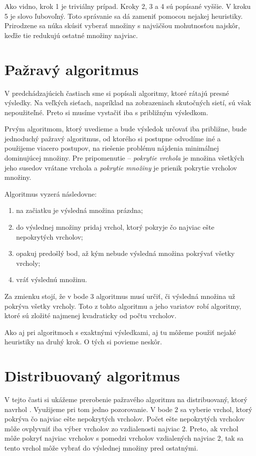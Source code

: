 Ako vidno, krok 1 je triviálny prípad. Kroky 2, 3 a 4 sú popísané vyššie. 
V kroku 5 je slovo ľubovoľný. Toto správanie sa dá zameniť pomocou nejakej 
heuristiky. Prirodzene sa núka skúsiť vyberať množiny s najväčšou mohutnosťou 
najskôr, keďže tie redukujú ostatné množiny najviac.

\section{Pažravý algoritmus}

V predchádzajúcich častiach sme si popísali algoritmy, ktoré rátajú presné 
výsledky. Na veľkých sieťach, napríklad na zobrazeniach skutočných sietí, 
sú však nepoužiteľné. Preto si musíme vystačiť iba s približným výsledkom. 

Prvým algoritmom, ktorý uvedieme a bude výsledok určovať iba približne, bude 
jednoduchý pažravý algoritmus, od ktorého si postupne odvodíme iné a použijeme 
viacero postupov, na riešenie problému nájdenia minimálnej dominujúcej množiny. 
Pre pripomenutie -- \emph{pokrytie vrchola} je množina všetkých jeho susedov 
vrátane vrchola a \emph{pokrytie množiny} je prienik pokrytie vrcholov množiny. 

Algoritmus vyzerá následovne:
\begin{enumerate}
	\item na začiatku je výsledná množina prázdna;
	\item do výslednej množiny pridaj vrchol, ktorý pokryje čo najviac ešte 
		nepokrytých vrcholov;
	\item opakuj predošlý bod, až kým nebude výsledná množina pokrývať všetky 
		vrcholy;
	\item vráť výslednú množinu.
\end{enumerate}

Za zmienku stojí, že v bode 3 algoritmus musí určiť, či výsledná množina už 
pokrýva všetky vrcholy. Toto z tohto algoritmu a jeho variatov robí algoritmy, 
ktoré sú zložité najmenej kvadraticky od počtu vrcholov.

Ako aj pri algoritmoch s exaktnými výsledkami, aj tu môžeme použiť nejaké 
heuristiky na druhý krok. O tých si povieme neskôr.

\section{Distribuovaný algoritmus}

V tejto časti si ukážeme prerobenie pažravého algoritmu na distribuovaný, ktorý 
navrhol \citet{chapS}. 
Využijeme pri tom jedno pozorovanie. V bode 2 sa vyberie vrchol, ktorý pokrýva 
čo najviac ešte nepokrytých vrcholov. Počet ešte nepokrytých vrcholov môže 
ovplyvniť iba výber vrcholov zo vzdialenosti najviac 2. Preto, ak vrchol môže 
pokryť najviac vrcholov s pomedzi vrcholov vzdialených najviac 2, tak sa tento 
vrchol môže vybrať do výslednej množiny pred ostatnými. 

